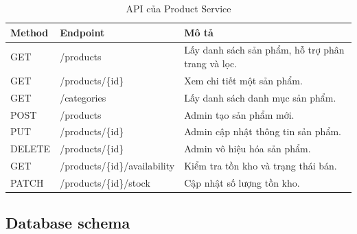 \documentclass[../main.tex]{subfiles}
\begin{document}
\begin{table}[H]
    \centering
    \caption{API của Product Service}
    \label{tab:chapter2-product-api}
    \begin{tabular}{|p{}|p{}|p{}|}
        \hline
        \rowcolor{primary!35}
        \textbf{Method} & \textbf{Endpoint} & \textbf{Mô tả} \\
        \hline
        GET & /products & Lấy danh sách sản phẩm, hỗ trợ phân trang và lọc. \\
        \hline
        GET & /products/\{id\} & Xem chi tiết một sản phẩm. \\
        \hline
        GET & /categories & Lấy danh sách danh mục sản phẩm. \\
        \hline
        POST & /products & Admin tạo sản phẩm mới. \\
        \hline
        PUT & /products/\{id\} & Admin cập nhật thông tin sản phẩm. \\
        \hline
        DELETE & /products/\{id\} & Admin vô hiệu hóa sản phẩm. \\
        \hline
        GET & /products/\{id\}/availability & Kiểm tra tồn kho và trạng thái bán. \\
        \hline
        PATCH & /products/\{id\}/stock & Cập nhật số lượng tồn kho. \\
        \hline
    \end{tabular}
\end{table}

\subsection{Database schema}
\label{subsection:2.3.5}
\end{document}
